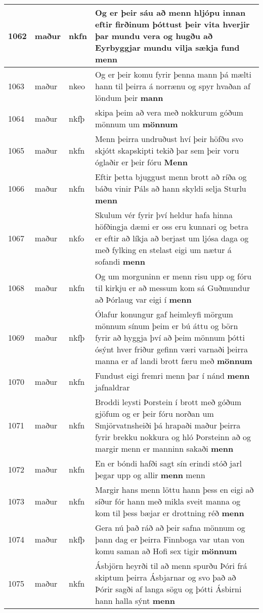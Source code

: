 \documentclass{article}
\begin{document}
\begin{longtable}{p{1cm}|p{1cm}|p{1cm}|p{13cm}}
\hline
1062&maður&nkfn&Og er þeir sáu að menn hljópu innan eftir firðinum þóttust þeir vita hverjir þar mundu vera og hugðu að Eyrbyggjar mundu vilja sækja fund \textbf{menn} \\
\hline
1063&maður&nkeo&Og er þeir komu fyrir þenna mann þá mælti hann til þeirra á norrænu og spyr hvaðan af löndum þeir \textbf{mann} \\
\hline
1064&maður&nkfþ&skipa þeim að vera með nokkurum góðum mönnum um \textbf{mönnum} \\
\hline
1065&maður&nkfn&Menn þeirra undruðust hví þeir höfðu svo skjótt skapskipti tekið þar sem þeir voru óglaðir er þeir fóru \textbf{Menn} \\
\hline
1066&maður&nkfn&Eftir þetta bjuggust menn brott að ríða og báðu vinir Páls að hann skyldi selja Sturlu \textbf{menn} \\
\hline
1067&maður&nkfo&Skulum vér fyrir því heldur hafa hinna höfðingja dæmi er oss eru kunnari og betra er eftir að líkja að berjast um ljósa daga og með fylking en stelast eigi um nætur á sofandi \textbf{menn} \\
\hline
1068&maður&nkfn&Og um morguninn er menn risu upp og fóru til kirkju er að messum kom sá Guðmundur að Þórlaug var eigi í \textbf{menn} \\
\hline
1069&maður&nkfþ&Ólafur konungur gaf heimleyfi mörgum mönnum sínum þeim er bú áttu og börn fyrir að hyggja því að þeim mönnum þótti ósýnt hver friður gefinn væri varnaði þeirra manna er af landi brott færu með \textbf{mönnum} \\
\hline
1070&maður&nkfn&Fundust eigi fremri menn þar í nánd \textbf{menn} jafnaldrar\\
\hline
1071&maður&nkfn&Broddi leysti Þorstein í brott með góðum gjöfum og er þeir fóru norðan um Smjörvatnsheiði þá hrapaði maður þeirra fyrir brekku nokkura og hló Þorsteinn að og margir menn er manninn sakaði \textbf{menn} \\
\hline
1072&maður&nkfn&En er bóndi hafði sagt sín erindi stóð jarl þegar upp og allir \textbf{menn} menn\\
\hline
1073&maður&nkfn&Margir hans menn löttu hann þess en eigi að síður fór hann með mikla sveit manna og kom til þess bæjar er drottning réð \textbf{menn} \\
\hline
1074&maður&nkfþ&Gera nú það ráð að þeir safna mönnum og þann dag er þeirra Finnboga var utan von komu saman að Hofi sex tigir \textbf{mönnum} \\
\hline
1075&maður&nkfn&Ásbjörn heyrði til að menn spurðu Þóri frá skiptum þeirra Ásbjarnar og svo það að Þórir sagði af langa sögu og þótti Ásbirni hann halla sýnt \textbf{menn} \\

\end{longtable}
\end{document}

